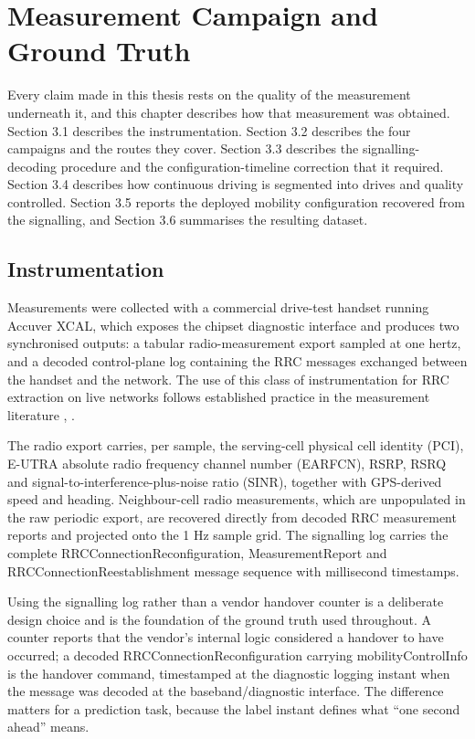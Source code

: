 \chapter{Measurement Campaign and Ground Truth}\label{ch:3}

Every claim made in this thesis rests on the quality of the measurement underneath it, and this chapter describes how that measurement was obtained. Section 3.1 describes the instrumentation. Section 3.2 describes the four campaigns and the routes they cover. Section 3.3 describes the signalling-decoding procedure and the configuration-timeline correction that it required. Section 3.4 describes how continuous driving is segmented into drives and quality controlled. Section 3.5 reports the deployed mobility configuration recovered from the signalling, and Section 3.6 summarises the resulting dataset.


\section{Instrumentation}
\label{sec:3_1}

Measurements were collected with a commercial drive-test handset running Accuver XCAL, which exposes the chipset diagnostic interface and produces two synchronised outputs: a tabular radio-measurement export sampled at one hertz, and a decoded control-plane log containing the RRC messages exchanged between the handset and the network. The use of this class of instrumentation for RRC extraction on live networks follows established practice in the measurement literature \cite{ref5}, \cite{ref4}.

The radio export carries, per sample, the serving-cell physical cell identity (PCI), E-UTRA absolute radio frequency channel number (EARFCN), RSRP, RSRQ and signal-to-interference-plus-noise ratio (SINR), together with GPS-derived speed and heading. Neighbour-cell radio measurements, which are unpopulated in the raw periodic export, are recovered directly from decoded RRC measurement reports and projected onto the 1 Hz sample grid. The signalling log carries the complete RRCConnectionReconfiguration, MeasurementReport and RRCConnectionReestablishment message sequence with millisecond timestamps.

Using the signalling log rather than a vendor handover counter is a deliberate design choice and is the foundation of the ground truth used throughout. A counter reports that the vendor's internal logic considered a handover to have occurred; a decoded RRCConnectionReconfiguration carrying mobilityControlInfo is the handover command, timestamped at the diagnostic logging instant when the message was decoded at the baseband/diagnostic interface. The difference matters for a prediction task, because the label instant defines what ``one second ahead'' means.



